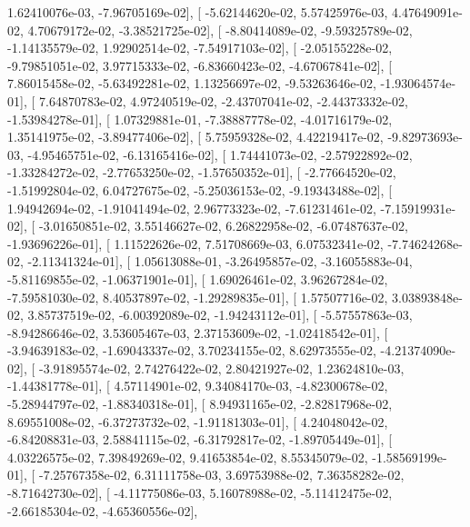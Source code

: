\documentclass{article}
\begin{document}
          1.62410076e-03,  -7.96705169e-02],
       [ -5.62144620e-02,   5.57425976e-03,   4.47649091e-02,
          4.70679172e-02,  -3.38521725e-02],
       [ -8.80414089e-02,  -9.59325789e-02,  -1.14135579e-02,
          1.92902514e-02,  -7.54917103e-02],
       [ -2.05155228e-02,  -9.79851051e-02,   3.97715333e-02,
         -6.83660423e-02,  -4.67067841e-02],
       [  7.86015458e-02,  -5.63492281e-02,   1.13256697e-02,
         -9.53263646e-02,  -1.93064574e-01],
       [  7.64870783e-02,   4.97240519e-02,  -2.43707041e-02,
         -2.44373332e-02,  -1.53984278e-01],
       [  1.07329881e-01,  -7.38887778e-02,  -4.01716179e-02,
          1.35141975e-02,  -3.89477406e-02],
       [  5.75959328e-02,   4.42219417e-02,  -9.82973693e-03,
         -4.95465751e-02,  -6.13165416e-02],
       [  1.74441073e-02,  -2.57922892e-02,  -1.33284272e-02,
         -2.77653250e-02,  -1.57650352e-01],
       [ -2.77664520e-02,  -1.51992804e-02,   6.04727675e-02,
         -5.25036153e-02,  -9.19343488e-02],
       [  1.94942694e-02,  -1.91041494e-02,   2.96773323e-02,
         -7.61231461e-02,  -7.15919931e-02],
       [ -3.01650851e-02,   3.55146627e-02,   6.26822958e-02,
         -6.07487637e-02,  -1.93696226e-01],
       [  1.11522626e-02,   7.51708669e-03,   6.07532341e-02,
         -7.74624268e-02,  -2.11341324e-01],
       [  1.05613088e-01,  -3.26495857e-02,  -3.16055883e-04,
         -5.81169855e-02,  -1.06371901e-01],
       [  1.69026461e-02,   3.96267284e-02,  -7.59581030e-02,
          8.40537897e-02,  -1.29289835e-01],
       [  1.57507716e-02,   3.03893848e-02,   3.85737519e-02,
         -6.00392089e-02,  -1.94243112e-01],
       [ -5.57557863e-03,  -8.94286646e-02,   3.53605467e-03,
          2.37153609e-02,  -1.02418542e-01],
       [ -3.94639183e-02,  -1.69043337e-02,   3.70234155e-02,
          8.62973555e-02,  -4.21374090e-02],
       [ -3.91895574e-02,   2.74276422e-02,   2.80421927e-02,
          1.23624810e-03,  -1.44381778e-01],
       [  4.57114901e-02,   9.34084170e-03,  -4.82300678e-02,
         -5.28944797e-02,  -1.88340318e-01],
       [  8.94931165e-02,  -2.82817968e-02,   8.69551008e-02,
         -6.37273732e-02,  -1.91181303e-01],
       [  4.24048042e-02,  -6.84208831e-03,   2.58841115e-02,
         -6.31792817e-02,  -1.89705449e-01],
       [  4.03226575e-02,   7.39849269e-02,   9.41653854e-02,
          8.55345079e-02,  -1.58569199e-01],
       [ -7.25767358e-02,   6.31111758e-03,   3.69753988e-02,
          7.36358282e-02,  -8.71642730e-02],
       [ -4.11775086e-03,   5.16078988e-02,  -5.11412475e-02,
         -2.66185304e-02,  -4.65360556e-02],
\end{document}
